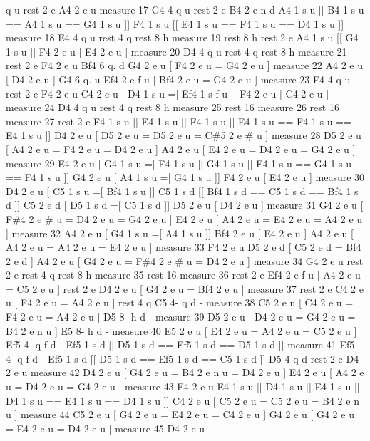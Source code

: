q u rest 2 e A4 2 e u measure 17 G4 4 q u rest 2 e B4 2 e n d A4 1 s u \mbox{[}\mbox{[} B4 1 s u == A4 1 s u == G4 1 s u \mbox{]}\mbox{]} F4 1 s u \mbox{[}\mbox{[} E4 1 s u == F4 1 s u == D4 1 s u \mbox{]}\mbox{]} measure 18 E4 4 q u rest 4 q rest 8 h measure 19 rest 8 h rest 2 e A4 1 s u \mbox{[}\mbox{[} G4 1 s u \mbox{]}\mbox{]} F4 2 e u \mbox{[} E4 2 e u \mbox{]} measure 20 D4 4 q u rest 4 q rest 8 h measure 21 rest 2 e F4 2 e u Bf4 6 q. d G4 2 e u \mbox{[} F4 2 e u = G4 2 e u \mbox{]} measure 22 A4 2 e u \mbox{[} D4 2 e u \mbox{]} G4 6 q. u Ef4 2 e f u \mbox{[} Bf4 2 e u = G4 2 e u \mbox{]} measure 23 F4 4 q u rest 2 e F4 2 e u C4 2 e u \mbox{[} D4 1 s u =\mbox{[} Ef4 1 s f u \mbox{]}\mbox{]} F4 2 e u \mbox{[} C4 2 e u \mbox{]} measure 24 D4 4 q u rest 4 q rest 8 h measure 25 rest 16 measure 26 rest 16 measure 27 rest 2 e F4 1 s u \mbox{[}\mbox{[} E4 1 s u \mbox{]}\mbox{]} F4 1 s u \mbox{[}\mbox{[} E4 1 s u == F4 1 s u == E4 1 s u \mbox{]}\mbox{]} D4 2 e u \mbox{[} D5 2 e u = D5 2 e u = C\#5 2 e \# u \mbox{]} measure 28 D5 2 e u \mbox{[} A4 2 e u = F4 2 e u = D4 2 e u \mbox{]} A4 2 e u \mbox{[} E4 2 e u = D4 2 e u = G4 2 e u \mbox{]} measure 29 E4 2 e u \mbox{[} G4 1 s u =\mbox{[} F4 1 s u \mbox{]}\mbox{]} G4 1 s u \mbox{[}\mbox{[} F4 1 s u == G4 1 s u == F4 1 s u \mbox{]}\mbox{]} G4 2 e u \mbox{[} A4 1 s u =\mbox{[} G4 1 s u \mbox{]}\mbox{]} F4 2 e u \mbox{[} E4 2 e u \mbox{]} measure 30 D4 2 e u \mbox{[} C5 1 s u =\mbox{[} Bf4 1 s u \mbox{]}\mbox{]} C5 1 s d \mbox{[}\mbox{[} Bf4 1 s d == C5 1 s d == Bf4 1 s d \mbox{]}\mbox{]} C5 2 e d \mbox{[} D5 1 s d =\mbox{[} C5 1 s d \mbox{]}\mbox{]} D5 2 e u \mbox{[} D4 2 e u \mbox{]} measure 31 G4 2 e u \mbox{[} F\#4 2 e \# u = D4 2 e u = G4 2 e u \mbox{]} E4 2 e u \mbox{[} A4 2 e u = E4 2 e u = A4 2 e u \mbox{]} measure 32 A4 2 e u \mbox{[} G4 1 s u =\mbox{[} A4 1 s u \mbox{]}\mbox{]} Bf4 2 e u \mbox{[} E4 2 e u \mbox{]} A4 2 e u \mbox{[} A4 2 e u = A4 2 e u = E4 2 e u \mbox{]} measure 33 F4 2 e u D5 2 e d \mbox{[} C5 2 e d = Bf4 2 e d \mbox{]} A4 2 e u \mbox{[} G4 2 e u = F\#4 2 e \# u = D4 2 e u \mbox{]} measure 34 G4 2 e u rest 2 e rest 4 q rest 8 h measure 35 rest 16 measure 36 rest 2 e Ef4 2 e f u \mbox{[} A4 2 e u = C5 2 e u \mbox{]} rest 2 e D4 2 e u \mbox{[} G4 2 e u = Bf4 2 e u \mbox{]} measure 37 rest 2 e C4 2 e u \mbox{[} F4 2 e u = A4 2 e u \mbox{]} rest 4 q C5 4-\/ q d -\/ measure 38 C5 2 e u \mbox{[} C4 2 e u = F4 2 e u = A4 2 e u \mbox{]} D5 8-\/ h d -\/ measure 39 D5 2 e u \mbox{[} D4 2 e u = G4 2 e u = B4 2 e n u \mbox{]} E5 8-\/ h d -\/ measure 40 E5 2 e u \mbox{[} E4 2 e u = A4 2 e u = C5 2 e u \mbox{]} Ef5 4-\/ q f d -\/ Ef5 1 s d \mbox{[}\mbox{[} D5 1 s d == Ef5 1 s d == D5 1 s d \mbox{]}\mbox{]} measure 41 Ef5 4-\/ q f d -\/ Ef5 1 s d \mbox{[}\mbox{[} D5 1 s d == Ef5 1 s d == C5 1 s d \mbox{]}\mbox{]} D5 4 q d rest 2 e D4 2 e u measure 42 D4 2 e u \mbox{[} G4 2 e u = B4 2 e n u = D4 2 e u \mbox{]} E4 2 e u \mbox{[} A4 2 e u = D4 2 e u = G4 2 e u \mbox{]} measure 43 E4 2 e u E4 1 s u \mbox{[}\mbox{[} D4 1 s u \mbox{]}\mbox{]} E4 1 s u \mbox{[}\mbox{[} D4 1 s u == E4 1 s u == D4 1 s u \mbox{]}\mbox{]} C4 2 e u \mbox{[} C5 2 e u = C5 2 e u = B4 2 e n u \mbox{]} measure 44 C5 2 e u \mbox{[} G4 2 e u = E4 2 e u = C4 2 e u \mbox{]} G4 2 e u \mbox{[} G4 2 e u = E4 2 e u = D4 2 e u \mbox{]} measure 45 D4 2 e u 